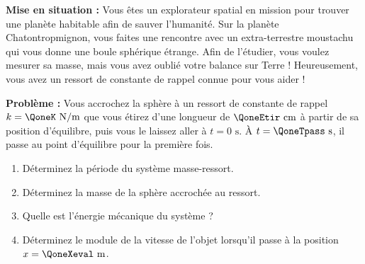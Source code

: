 
\textbf{Mise en situation :} Vous êtes un explorateur spatial en mission pour trouver une planète habitable afin de sauver l'humanité. Sur la planète Chatontropmignon, vous faites une rencontre avec un extra-terrestre moustachu qui vous donne une boule sphérique étrange. Afin de l'étudier, vous voulez mesurer sa masse, mais vous avez oublié votre balance sur Terre ! Heureusement, vous avez un ressort de constante de rappel connue pour vous aider !

\textbf{Problème :} Vous accrochez la sphère à un ressort de constante de rappel $k = \QoneK\text{ N/m}$ que vous étirez d'une longueur de $\QoneEtir\text{ cm}$ à partir de sa position d'équilibre, puis vous le laissez aller à $t = 0\text{ s}$. À $t = \QoneTpass\text{ s}$, il passe au point d'équilibre pour la première fois.

\begin{enumerate}[label=\alph*)]
    \item Déterminez la période du système masse-ressort.
    \item Déterminez la masse de la sphère accrochée au ressort.
    \item Quelle est l'énergie mécanique du système ?
    \item Déterminez le module de la vitesse de l'objet lorsqu'il passe à la position $x = \QoneXeval\text{ m}$.
\end{enumerate}
